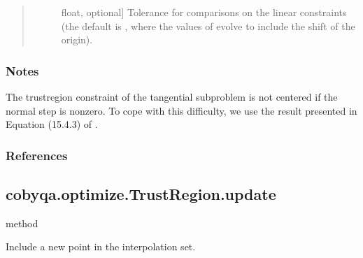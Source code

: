 \documentclass[letterpaper,10pt,english]{sphinxmanual}
\begin{document}
\begin{fulllineitems}
\begin{fulllineitems}
\begin{quote}
\begin{description}
\begin{description}
\item[{}] \leavevmode{[}float, optional{]}
\sphinxAtStartPar
Tolerance for comparisons on the linear constraints (the default is
, where the
values of  evolve to include the shift of the origin).

\end{description}

\end{description}\end{quote}
\subsubsection*{Notes}

\sphinxAtStartPar
The trust\sphinxhyphen{}region constraint of the tangential subproblem is not centered
if the normal step is nonzero. To cope with this difficulty, we use the
result presented in Equation (15.4.3) of .
\subsubsection*{References}

\sphinxAtStartPar
{}

\end{fulllineitems}



\subsection{cobyqa.optimize.TrustRegion.update}
\label{\detokenize{refs/generated/cobyqa.optimize.TrustRegion.update:cobyqa-optimize-trustregion-update}}\label{\detokenize{refs/generated/cobyqa.optimize.TrustRegion.update::doc}}
\sphinxAtStartPar
method

\begin{fulllineitems}
\label{\detokenize{refs/generated/cobyqa.optimize.TrustRegion.update:cobyqa.optimize.TrustRegion.update}}
\sphinxAtStartPar
Include a new point in the interpolation set.


\end{fulllineitems}
\end{fulllineitems}
\end{document}
